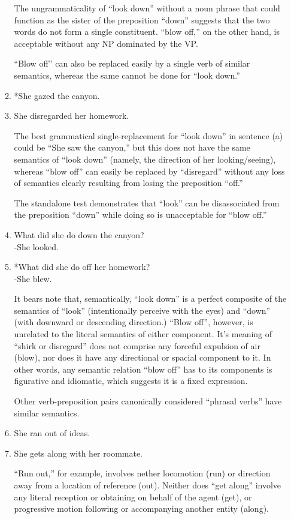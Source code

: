 \documentclass[12pt]{article}
\begin{document}
\begin{enumerate}
\begin{enumerate}
The ungrammaticality of ``look down'' without a noun phrase that could function as the sister of the preposition ``down'' suggests that the two words do not form a single constituent. ``blow off,'' on the other hand, is acceptable without any NP dominated by the VP.

``Blow off'' can also be replaced easily by a single verb of similar semantics, whereas the same cannot be done for ``look down.''
\item *She gazed the canyon.
\item She disregarded her homework.

The best grammatical single-replacement for ``look down'' in sentence (a) could be ``She saw the canyon,'' but this does not have the same semantics of ``look down'' (namely, the direction of her looking/seeing), whereas ``blow off'' can easily be replaced by ``disregard'' without any loss of semantics clearly resulting from losing the preposition ``off.''

The standalone test demonstrates that ``look'' can be disassociated from the preposition ``down'' while doing so is unacceptable for ``blow off.''
\item What did she do down the canyon?\\
-She looked.
\item *What did she do off her homework?\\
-She blew.

It bears note that, semantically, ``look down'' is a perfect composite of the semantics of ``look'' (intentionally perceive with the eyes) and ``down'' (with downward or descending direction.) ``Blow off'', however, is unrelated to the literal semantics of either component. It's meaning of ``shirk or disregard'' does not comprise any forceful expulsion of air (blow), nor does it have any directional or spacial component to it. In other words, any semantic relation ``blow off'' has to its components is figurative and idiomatic, which suggests it is a fixed expression.

Other verb-preposition pairs canonically considered ``phrasal verbs'' have similar semantics.
\item She ran out of ideas.
\item She gets along with her roommate.

``Run out,'' for example, involves nether locomotion (run) or direction away from a location of reference (out). Neither does ``get along'' involve any literal reception or obtaining on behalf of the agent (get), or progressive motion following or accompanying another entity (along).


\end{enumerate}
\end{enumerate}
\end{document}
